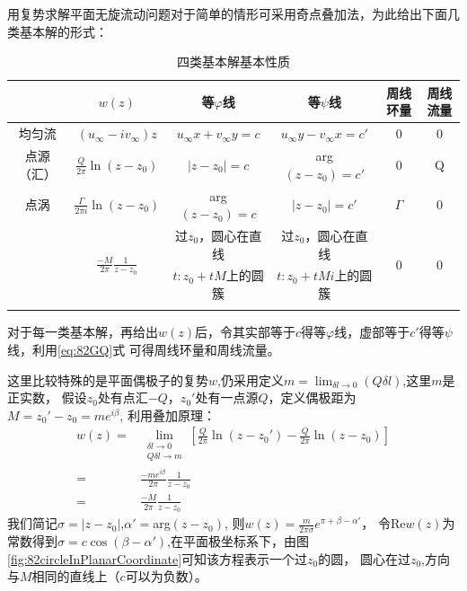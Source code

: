 用复势求解平面无旋流动问题对于简单的情形可采用奇点叠加法，为此给出下面几类基本解的形式：

\begin{table}[!ht]
\centering
\begin{tabular}{cccccc}
\Xhline{1pt}
&$w(z)$ &等$\varphi$线 & 等$\psi$线 & 周线环量 & 周线流量\\
\hline\noalign{\smallskip}
均匀流 & $(u_{\infty}-iv_{\infty})z$ & $u_{\infty}x+v_{\infty}y=c$ & $u_{\infty}y-v_{\infty}x=c'$ & 0 & 0 \\[0.1cm]
\hline\noalign{\smallskip}
点源（汇） & $\frac{Q}{2\pi} \ln(z-z_0)$ & $|z-z_0|=c$ & arg$(z-z_0)=c'$ & 0 & Q \\[0.1cm]
\hline\noalign{\smallskip}
点涡 & $\frac{\Gamma}{2\pi i} \ln(z-z_0)$ & arg$(z-z_0)=c$ & $|z-z_0|=c'$ & $\Gamma$ & 0 \\[0.1cm]
\hline\noalign{\smallskip}
\multirow{2}{*}{平面偶极子} & \multirow{2}{*}{$\frac{-M}{2\pi} \frac{1}{z-z_0}$} & 过$z_0$，圆心在直线 & 过$z_0$，圆心在直线 & \multirow{2}{*}{0} & \multirow{2}{*}{0} \\
& & $t:z_0+tM$上的圆簇 & $t:z_0+tMi$上的圆簇 & & \\[0.1cm]
\Xhline{1pt}
\end{tabular}
\caption{四类基本解基本性质}\label{tb:82FourBasic}
\end{table}

对于每一类基本解，再给出$w(z)$后，令其实部等于$c$得等$\varphi$线，虚部等于$c'$得等$\psi$线，利用\eqref{eq:82GQ}式
可得周线环量和周线流量。

这里比较特殊的是平面偶极子的复势$w$,仍采用定义$m=\displaystyle\lim_{\delta l \to 0}(Q\delta l)$,这里$m$是正实数，
假设$z_0$处有点汇$-Q$，$z_0'$处有一点源$Q$，定义偶极距为$M=z_0'-z_0=me^{i\beta}$,
利用叠加原理：
\begin{align*}
w(z)=&\lim\limits_{\substack{\delta l\to 0\\Q\delta l \to m}} \left[ \frac{Q}{2\pi}\ln(z-z_0') - \frac{Q}{2\pi}\ln(z-z_0) \right]\\
=& \frac{-m e^{i\beta}}{2\pi}\frac{1}{z-z_0}\\
=& \frac{-M}{2\pi} \frac{1}{z-z_0}
\end{align*}
我们简记$\sigma=|z-z_0|$,$\alpha'=$arg$(z-z_0)$, 则$w(z)=\frac{m}{2\pi\sigma}e^{\pi+\beta-\alpha'}$，
令Re$w(z)$为常数得到$\sigma=c\cos(\beta-\alpha')$,在平面极坐标系下，由图\ref{fig:82circleInPlanarCoordinate}可知该方程表示一个过$z_0$的圆，
圆心在过$z_0$,方向与$M$相同的直线上（$c$可以为负数）。

